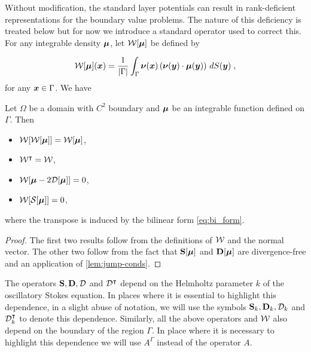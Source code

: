 Without modification, the standard layer potentials
can result in rank-deficient representations for
the boundary value problems. The nature of this deficiency
is treated below but for now we introduce a standard
operator used to correct this. For any integrable density
${\boldsymbol \mu}$, let ${\mathcal W}[{\boldsymbol \mu}]$ be defined by

\begin{equation} \label{eq:ones_operator}
  {\mathcal W}[{\boldsymbol \mu}]({\boldsymbol x}) = \frac{1}{|\Gamma|} \int_\Gamma {\boldsymbol \nu}({\boldsymbol x})
  \left ( {\boldsymbol \nu}({\boldsymbol y}) \cdot {\boldsymbol \mu}({\boldsymbol y}) \right )
  \, dS({\boldsymbol y}) \; ,
\end{equation}
for any ${\boldsymbol x} \in \Gamma$. We have

\begin{lem}
  \label{lem:propnullspacecorr}

  Let $\Omega$ be a domain with $C^2$ boundary and ${\boldsymbol \mu}$ be
  an integrable function defined on $\Gamma$. Then
  \begin{itemize}
  \item ${\mathcal W}[{\mathcal W}[{\boldsymbol \mu}]] = {\mathcal W}[{\boldsymbol \mu}]$,
  \item ${\mathcal W}^\intercal = {\mathcal W}$,
  \item ${\mathcal W}[{\boldsymbol \mu} - 2 {\mathcal D}[{\boldsymbol \mu}]] = 0$,
  \item ${\mathcal W}[{\mathcal S}[{\boldsymbol \mu}]] = 0$,
  \end{itemize}
  where the transpose is induced by the bilinear
  form \cref{eq:bi_form}.
\end{lem}

\begin{proof}
  The first two results follow from the definitions of ${\mathcal W}$ and
  the normal vector. The other two follow from the fact that
  ${\bf S}[{\boldsymbol \mu}]$ and ${\bf D}[{\boldsymbol \mu}]$ are divergence-free and
  an application of \cref{lem:jump-conds}.
\end{proof}

\begin{remark}
The operators ${\bf S},{\bf D},{\mathcal D}$ and ${\mathcal D}^{\intercal}$
depend on the Helmholtz parameter $k$ of the oscillatory Stokes equation.
In places where it is essential to highlight this dependence, in a slight
abuse of notation, we will use the symbols ${\bf S}_{k}, {\bf D}_{k},{\mathcal D}_{k}$ and ${\mathcal D}^{\intercal}_{k}$ to 
denote this dependence.
Similarly, all the above operators and ${\mathcal W}$ also depend on the boundary of the
region $\Gamma$. In place where it is necessary to highlight this dependence
we will use $A^{\Gamma}$ instead of the operator $A$.
\end{remark}

